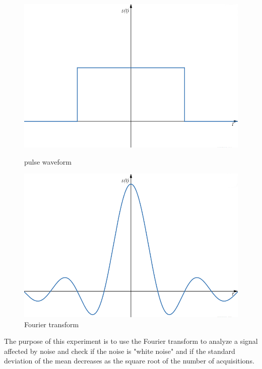 \documentclass[a4paper,12pt]{article}
\begin{document}
\begin{figure}[H]
    \centering
    \begin{minipage}[b]{0.40\linewidth} %
        \centering
        \includegraphics[width=\linewidth]{pulse.png}
        \caption{pulse waveform}
    \end{minipage}
    \hspace{0.05\linewidth} %
    \begin{minipage}[b]{0.40\linewidth} %
        \centering
        \includegraphics[width=\linewidth]{f.t_pulse.png}
        \caption{Fourier transform }
    \end{minipage}
\end{figure}
The purpose of this experiment is to use the Fourier transform to analyze a 
signal affected by noise and check if the noise is "white noise" and if the 
standard deviation of the mean decreases as the square root of the number of 
acquisitions.
\end{document}

